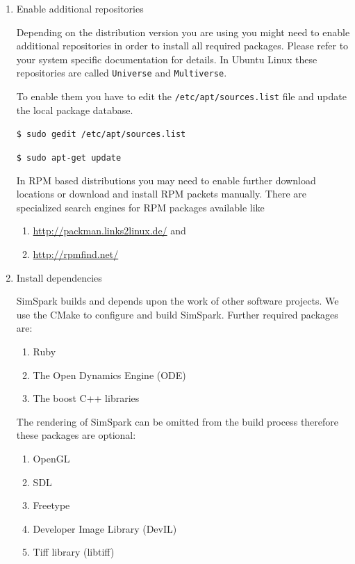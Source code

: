 \begin{enumerate}

\item Enable additional repositories

Depending on the distribution version you are using you might need to
enable additional repositories in order to install all required
packages. Please refer to your system specific documentation for
details. In Ubuntu Linux these repositories are called
\texttt{Universe} and \texttt{Multiverse}.

To enable them you have to edit the \texttt{/etc/apt/sources.list}
file and update the local package database.

\texttt{\$ sudo gedit /etc/apt/sources.list}


\texttt{\$ sudo apt-get update}


In RPM based distributions you may need to enable further download
locations or download and install RPM packets manually. There are
specialized search engines for RPM packages available like 

\begin{enumerate}
\item\url{http://packman.links2linux.de/} and
\item\url{http://rpmfind.net/}
\end{enumerate}

\item Install dependencies

SimSpark builds and depends upon the work of other software
projects. We use the CMake to configure and build
SimSpark.
Further required packages are:

\begin{enumerate}
\item Ruby
\item The Open Dynamics Engine (ODE)
\item The boost C++ libraries
\end{enumerate}

The rendering of SimSpark can be omitted from the build process
therefore these packages are optional:

\begin{enumerate}
\item OpenGL
\item SDL
\item Freetype
\item Developer Image Library (DevIL)
\item Tiff library (libtiff)
\end{enumerate}


\end{enumerate}
